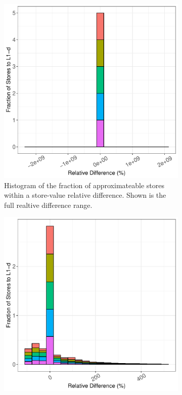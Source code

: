 \begin{figure}[htbp]
	\begin{subfigure}{0.33\textwidth}
		\centering
		\includegraphics[scale=0.4]{graphs/linear_regression_top5/full_hist.pdf}
		\caption{Histogram of the fraction of approximateable stores within a store-value relative difference. Shown is the full realtive difference range.}
	\end{subfigure}
	\begin{subfigure}{0.33\textwidth}
		\centering
		\includegraphics[scale=0.4]{graphs/linear_regression_top5/narrow_hist.pdf}

\end{subfigure}
\end{figure}
